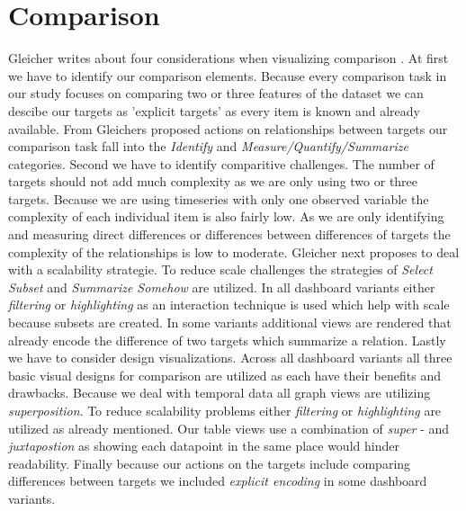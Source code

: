 \section{Comparison}
Gleicher writes about four considerations when visualizing comparison \citep*{Gleicher.2018}.
At first we have to identify our comparison elements. Because every comparison task in our
study focuses on comparing two or three features of the dataset we can descibe our targets as
'explicit targets' as every item is known and already available. From Gleichers proposed
actions on relationships between targets our comparison task fall into the \textit{Identify}
and \textit{Measure/Quantify/Summarize} categories. Second we have to identify comparitive
challenges. The number of targets should not add much complexity as we are only using two
or three targets. Because we are using timeseries with only one observed variable the
complexity of each individual item is also fairly low. As we are only identifying and
measuring direct differences or differences between differences of targets the complexity
of the relationships is low to moderate. Gleicher next proposes to deal with a scalability
strategie. To reduce scale challenges the strategies of \textit{Select Subset} and 
\textit{Summarize Somehow} are utilized. In all dashboard variants either \textit{filtering} or
\textit{highlighting} as an interaction technique is used which help with scale because subsets
are created. In some variants additional views are rendered that already encode the
difference of two targets which summarize a relation. Lastly we have to consider design
visualizations. Across all dashboard variants all three basic visual designs for comparison
are utilized as each have their benefits and drawbacks. Because we deal with temporal data
all graph views are utilizing \textit{superposition}. To reduce scalability problems either
\textit{filtering} or \textit{highlighting} are utilized as already mentioned. Our table views
use a combination of \textit{super} - and \textit{juxtapostion} as showing each datapoint in the
same place would hinder readability. Finally because our actions on the targets include comparing
differences between targets we included \textit{explicit encoding} in some dashboard variants.